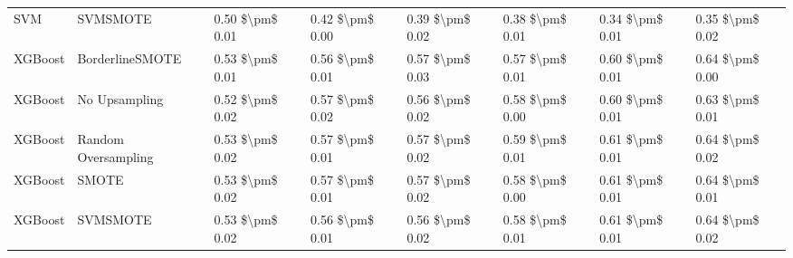 \begin{tabular}{llllllll}
                            SVM &                      SVMSMOTE & 0.50 \$\textbackslash pm\$ 0.01 &           0.42 \$\textbackslash pm\$ 0.00 &       0.39 \$\textbackslash pm\$ 0.02 &        0.38 \$\textbackslash pm\$ 0.01 &                         0.34 \$\textbackslash pm\$ 0.01 &     0.35 \$\textbackslash pm\$ 0.02 \\
                        XGBoost &               BorderlineSMOTE & 0.53 \$\textbackslash pm\$ 0.01 &           0.56 \$\textbackslash pm\$ 0.01 &       0.57 \$\textbackslash pm\$ 0.03 &        0.57 \$\textbackslash pm\$ 0.01 &                         0.60 \$\textbackslash pm\$ 0.01 &     0.64 \$\textbackslash pm\$ 0.00 \\
                        XGBoost &                 No Upsampling & 0.52 \$\textbackslash pm\$ 0.02 &           0.57 \$\textbackslash pm\$ 0.02 &       0.56 \$\textbackslash pm\$ 0.02 &        0.58 \$\textbackslash pm\$ 0.00 &                         0.60 \$\textbackslash pm\$ 0.01 &     0.63 \$\textbackslash pm\$ 0.01 \\
                        XGBoost &           Random Oversampling & 0.53 \$\textbackslash pm\$ 0.02 &           0.57 \$\textbackslash pm\$ 0.01 &       0.57 \$\textbackslash pm\$ 0.02 &        0.59 \$\textbackslash pm\$ 0.01 &                         0.61 \$\textbackslash pm\$ 0.01 &     0.64 \$\textbackslash pm\$ 0.02 \\
                        XGBoost &                         SMOTE & 0.53 \$\textbackslash pm\$ 0.02 &           0.57 \$\textbackslash pm\$ 0.01 &       0.57 \$\textbackslash pm\$ 0.02 &        0.58 \$\textbackslash pm\$ 0.00 &                         0.61 \$\textbackslash pm\$ 0.01 &     0.64 \$\textbackslash pm\$ 0.01 \\
                        XGBoost &                      SVMSMOTE & 0.53 \$\textbackslash pm\$ 0.02 &           0.56 \$\textbackslash pm\$ 0.01 &       0.56 \$\textbackslash pm\$ 0.02 &        0.58 \$\textbackslash pm\$ 0.01 &                         0.61 \$\textbackslash pm\$ 0.01 &     0.64 \$\textbackslash pm\$ 0.02 \\
\bottomrule
\end{tabular}
